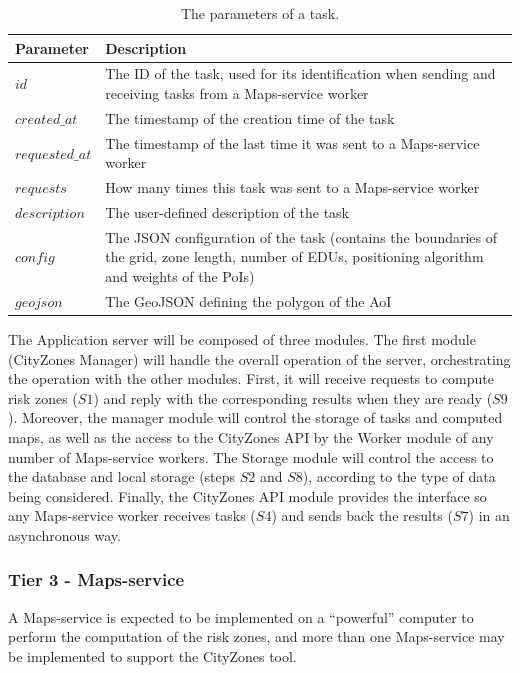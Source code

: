 \begin{refsection}
\begin{table}[h]
  \centering
  \caption{The parameters of a task.}\label{tab:task}
  \begin{tabular}{p{.2\linewidth}p{.7\linewidth}}
    \hline
    \textbf{Parameter} & \textbf{Description} \\
    \hline
    $id$            & The ID of the task, used for its identification when sending and receiving tasks from a Maps-service worker \\
    $created\_at$   & The timestamp of the creation time of the task \\
    $requested\_at$ & The timestamp of the last time it was sent to a Maps-service worker \\
    $requests$      & How many times this task was sent to a Maps-service worker \\
    $description$   & The user-defined description of the task \\
    $config$        & The JSON configuration of the task (contains the boundaries of the grid, zone length, number of EDUs, positioning algorithm and weights of the PoIs) \\
    $geojson$       & The GeoJSON defining the polygon of the AoI \\
    \hline
  \end{tabular}
\end{table}

The Application server will be composed of three modules. The first module (CityZones Manager) will handle the overall operation of the server, orchestrating the operation with the other modules. First, it will receive requests to compute risk zones ($S1$) and reply with the corresponding results when they are ready ($S9$). Moreover, the manager module will control the storage of tasks and computed maps, as well as the access to the CityZones API by the Worker module of any number of Maps-service workers. The Storage module will control the access to the database and local storage (steps $S2$ and $S8$), according to the type of data being considered. Finally, the CityZones API module provides the interface so any Maps-service worker receives tasks ($S4$) and sends back the results ($S7$) in an asynchronous way.

\subsubsection{Tier 3 - Maps-service}

A Maps-service is expected to be implemented on a ``powerful'' computer to perform the computation of the risk zones, and more than one Maps-service may be implemented to support the CityZones tool.


\end{refsection}
